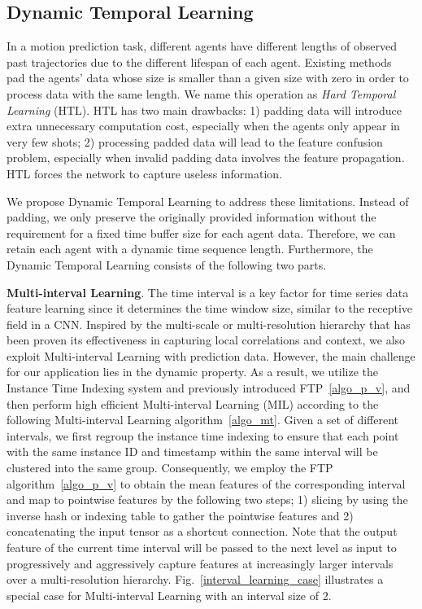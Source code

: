 \documentclass[final]{cvpr}
\begin{document}
\subsection{Dynamic Temporal Learning}
\label{sec:Dynamic Temporal Learning}
In a motion prediction task, different agents have different lengths of observed past trajectories due to the different lifespan of each agent. Existing methods~\cite{hochreiter1997long, liang2020learning} pad the agents' data whose size is smaller than a given size  
with zero in order to process data with the same length. We name this operation as \textit{Hard Temporal Learning} (HTL).
HTL has two main drawbacks: 1) padding data will introduce extra unnecessary computation cost, especially when the agents only appear in very few shots; 2) processing padded data will lead to the feature confusion problem, especially when invalid padding data involves the feature propagation. HTL forces the network to capture useless information. 

We propose Dynamic Temporal Learning to address these limitations. Instead of padding, we only preserve the originally provided information without the requirement for a fixed time buffer size for each agent data. 
Therefore, we can retain each agent with a dynamic time sequence length. Furthermore, the Dynamic Temporal Learning consists of the following two parts.

\textbf{Multi-interval Learning}. The time interval is a key factor for time series data feature learning since it determines the time window size, similar to the receptive field in a CNN. Inspired by the multi-scale or multi-resolution hierarchy that has been proven its effectiveness in capturing local correlations and context, we also exploit Multi-interval Learning with prediction data. However, the main challenge for our application lies in the dynamic property. As a result, we utilize the Instance Time Indexing system and previously introduced FTP~\ref{algo_p_v}, and then perform high efficient Multi-interval Learning (MIL) according to the following Multi-interval Learning algorithm~\ref{algo_mt}.
Given a set of different intervals, we first regroup the instance time indexing to ensure that each point with the same instance ID and timestamp within the same interval will be clustered into the same group. Consequently, we employ the FTP algorithm~\ref{algo_p_v} to obtain the mean features of the corresponding interval and map to pointwise features by the following two steps; 1) slicing by using the inverse hash or indexing table to gather the pointwise features and 2) concatenating the input tensor as a shortcut connection. Note that the output feature of the current time interval will be passed to the next level as input to progressively and aggressively capture features at increasingly larger intervals over a multi-resolution hierarchy. Fig.~\ref{interval_learning_case} illustrates a special case for Multi-interval Learning with an interval size of 2. 
\end{document}
